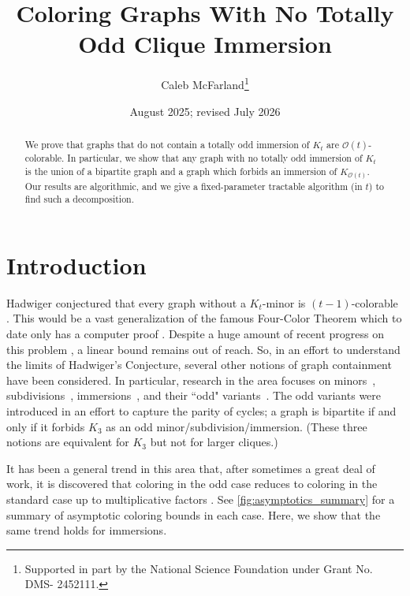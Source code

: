 \documentclass{article}
\title{Coloring Graphs With No Totally Odd Clique Immersion}
\author[1]{Caleb McFarland\footnote{Supported in part by the National Science Foundation under Grant No. DMS- 2452111.}
}
\affil[1]{School of Mathematics, Georgia Institute of Technology}
\date{August 2025; revised July 2026}
\theoremstyle{definition}
\begin{document}
\maketitle

\begin{abstract}
    We prove that graphs that do not contain a totally odd immersion of $K_t$ are $\mathcal{O}(t)$-colorable. In particular, we show that any graph with no totally odd immersion of $K_t$ is the union of a bipartite graph and a graph which forbids an immersion of $K_{\mathcal{O}(t)}$. Our results are algorithmic, and we give a fixed-parameter tractable algorithm (in $t$) to find such a decomposition.
\end{abstract}

\section{Introduction}
Hadwiger conjectured that every graph without a $K_t$-minor is $(t-1)$-colorable \cite{hadwiger1943klassifikation}. This would be a vast generalization of the famous Four-Color Theorem which to date only has a computer proof \cite{appel1989every, Robertson1997FourColorTheorem}. Despite a huge amount of recent progress on this problem \cite{delcourt2025reducing, kostochka1984lower, norin2023breaking, postle2020even, thomason1984extremal}, a linear bound remains out of reach. So, in an effort to understand the limits of Hadwiger's Conjecture, several other notions of graph containment have been considered. In particular, research in the area focuses on minors~\cite{delcourt2025reducing, hadwiger1943klassifikation, kostochka1984lower, norin2023breaking, thomason1984extremal}, subdivisions~\cite{bollobas1998proof, Catlin1979hajos, Hajos1961uber, komlos1996topological}, immersions~\cite{Abu2003graph, Devos2014Minimum, Gauthier2019Forcing, Lescure1988problem}, and their ``odd" variants~\cite{Churchley2017Odd, Jensen1995GraphColoring, Kawarabayashi2013Totally, Steiner2022Asymptotic}. The odd variants were introduced in an effort to capture the parity of cycles; a graph is bipartite if and only if it forbids $K_3$ as an odd minor/subdivision/immersion. (These three notions are equivalent for $K_3$ but not for larger cliques.)

It has been a general trend in this area that, after sometimes a great deal of work, it is discovered that coloring in the odd case reduces to coloring in the standard case up to multiplicative factors \cite{Kawarabayashi2013Totally, Steiner2022Asymptotic}. See \cref{fig:asymptotics_summary} for a summary of asymptotic coloring bounds in each case. Here, we show that the same trend holds for immersions.
\end{document}
